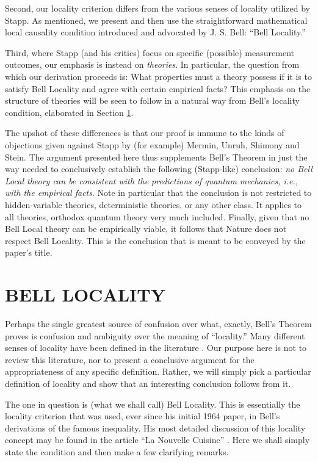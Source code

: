 \documentclass[aps,prc,onecolumn,12pt]{revtex4-2}
\begin{document}
Second, our locality criterion differs from the various
senses of locality utilized by Stapp.  As mentioned, we present and
then use the straightforward mathematical local
causality condition introduced and advocated by J. S. Bell:  ``Bell
Locality.''

Third, where Stapp (and his critics) focus on specific (possible)
measurement outcomes, our emphasis is instead on \emph{theories}.  In
particular, the question from which our derivation proceeds is:  What
properties must a theory possess if it is to satisfy Bell Locality and
agree with certain empirical facts?  This emphasis on the structure of
theories will be seen to follow in a natural way from
Bell's locality condition, elaborated in Section \ref{sec2}.

The upshot of these differences is that our proof is immune to the
kinds of objections given against Stapp by (for example) Mermin,
Unruh, Shimony and Stein.  The argument
presented here thus supplements Bell's Theorem in just the way
needed to conclusively establish the following (Stapp-like)
conclusion:  \emph{no Bell Local theory can be consistent with the
predictions of quantum mechanics, i.e., with the empirical facts}.
Note in particular that the conclusion is not
restricted to hidden-variable theories, deterministic theories, or any
other class.  It applies to all theories, orthodox quantum theory very
much included.  Finally, given that no Bell Local theory can be
empirically viable, it follows that Nature does not respect
Bell Locality.  This is the conclusion that is meant to be conveyed by
the paper's title.



\section{BELL LOCALITY}
\label{sec2}

Perhaps the single greatest source of confusion over what, exactly,
Bell's Theorem proves is confusion and ambiguity over the meaning of
``locality.''  Many different senses of locality have been defined in the
literature \cite{maudlin,eberhard}.  Our purpose here is not to review
this literature, nor to
present a conclusive argument for the appropriateness of any
specific definition.  Rather,
we will simply pick a particular definition of locality and show that
an interesting conclusion follows from it.

The one in question is (what we shall call) Bell Locality.  This is
essentially the locality criterion that was used, ever since his
initial 1964 paper, in Bell's derivations of the famous inequality.
His most detailed discussion of this locality concept may be found
in the article ``La Nouvelle Cuisine'' \cite[pages 232-48]{bell}.
Here we shall simply state the condition and then make a few clarifying
remarks.
\end{document}
